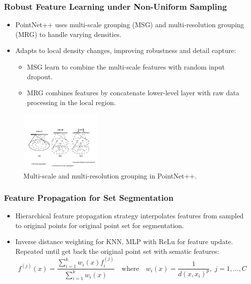 \documentclass[11pt,xcolor={dvipsnames},hyperref={pdftex,pdfpagemode=UseNone,hidelinks,pdfdisplaydoctitle=true},usepdftitle=false]{beamer}
\begin{document}
\begin{frame}
\frametitle{Robust Feature Learning under Non-Uniform Sampling}
\begin{itemize}
  \item PointNet++ uses multi-scale grouping (MSG) and multi-resolution grouping (MRG) to handle varying densities.
  \item Adapts to local density changes, improving robustness and detail capture:
  \begin{itemize}
    \item MSG learn to combine the multi-scale features with random input dropout.
    \item MRG combines features by concatenate lower-level layer with raw data processing in the local region.
  \end{itemize}
\end{itemize}
  \begin{figure}
      \includegraphics[width=4cm]{./media/_pointnet/multiscale.pdf}
      \caption{Multi-scale and multi-resolution grouping in PointNet++.}
      \label{fig:multiscale}
  \end{figure}
\end{frame}

\begin{frame}
\frametitle{Feature Propagation for Set Segmentation}
\begin{itemize}
  \item Hierarchical feature propagation strategy interpolates features from sampled to original points for original point set for segmentation.
  \item Inverse distance weighting for KNN, MLP with ReLu for feature update. Repeated until get back the original point set with sematic features:
  \begin{equation}
    f^{(j)}(x) = \frac{\sum_{i=1}^{k}w_i (x) f_i^{(j)}}{\sum_{i=1}^k w_i (x)}
    \quad \text{where}\quad w_i(x) = \frac{1}{d(x,x_i)^p},\; j=1,...,C
  \end{equation}
\end{itemize}
\end{frame}
\end{document}
